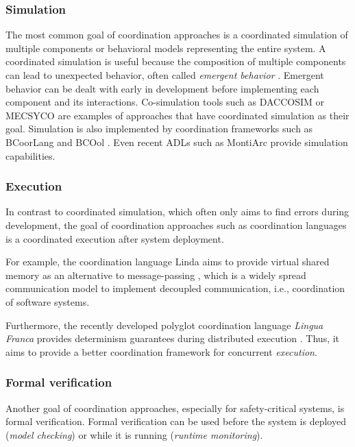 \documentclass[runningheads]{llncs}
\begin{document}
\subsubsection{Simulation} The most common goal of coordination approaches is a coordinated simulation of multiple components or behavioral models representing the entire system.
A coordinated simulation is useful because the composition of multiple components can lead to unexpected behavior, often called \textit{emergent behavior} \cite{ekerTamingHeterogeneityPtolemy2003}.
Emergent behavior can be dealt with early in development before implementing each component and its interactions.
Co-simulation tools such as DACCOSIM \cite{galtierFMIBasedDistributedMultiSimulation} or MECSYCO \cite{camusCosimulationCyberphysicalSystems2018} are examples of approaches that have coordinated simulation as their goal.
Simulation is also implemented by coordination frameworks such as BCoorLang \cite{krauterBehavioralConsistencyMultimodeling2023} and BCOol \cite{varalarsenBehavioralCoordinationOperator2015}.
Even recent ADLs such as MontiArc \cite{haberMontiArcArchitecturalModeling2014} provide simulation capabilities.

\subsubsection{Execution} In contrast to coordinated simulation, which often only aims to find errors during development, the goal of coordination approaches such as coordination languages is a coordinated execution after system deployment.

For example, the coordination language Linda aims to provide virtual shared memory as an alternative to message-passing \cite{carrieroLindaAlternativeMessagepassing1994}, which is a widely spread communication model to implement decoupled communication, i.e., coordination of software systems.

Furthermore, the recently developed polyglot coordination language \textit{Lingua Franca} provides determinism guarantees during distributed execution \cite{lohstrohLinguaFrancaDeterministic2021}.
Thus, it aims to provide a better coordination framework for concurrent \textit{execution}.


\subsubsection{Formal verification} Another goal of coordination approaches, especially for safety-critical systems, is formal verification.
Formal verification can be used before the system is deployed (\textit{model checking}) or while it is running (\textit{runtime monitoring}).
\end{document}
